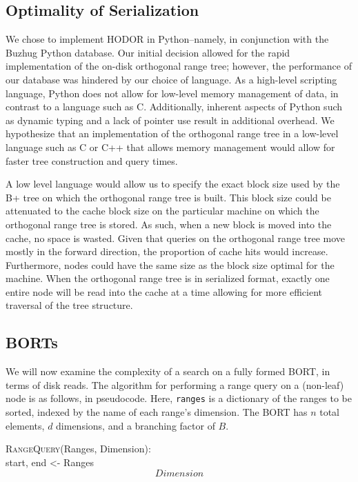 \documentclass[11pt, oneside]{article}
\newcommand{\ms}{\texttt}
\begin{document}
\subsection{Optimality of Serialization}

We chose to implement HODOR in Python--namely, in conjunction with the Buzhug Python database. Our initial decision allowed for the rapid implementation of the on-disk orthogonal range tree; however, the performance of our database was hindered by our choice of language. As a high-level scripting language, Python does not allow for low-level memory management of data, in contrast to a language such as C. Additionally, inherent aspects of Python such as dynamic typing and a lack of pointer use result in additional overhead. We hypothesize that an implementation of the orthogonal range tree in a low-level language such as C or C++ that allows memory management would allow for faster tree construction and query times. 

A low level language would allow us to specify the exact block size used by the B+ tree on which the orthogonal range tree is built. This block size could be attenuated to the cache block size on the particular machine on which the orthogonal range tree is stored. As such, when a new block is moved into the cache, no space is wasted. Given that queries on the orthogonal range tree move mostly in the forward direction, the proportion of cache hits would increase. Furthermore, nodes could have the same size as the block size optimal for the machine. When the orthogonal range tree is in serialized format, exactly one entire node will be read into the cache at a time allowing for more efficient traversal of the tree structure.

\subsection{BORTs}

We will now examine the complexity of a search on a fully formed BORT, in terms
of disk reads. The algorithm for performing a range query on a (non-leaf) node
is as follows, in pseudocode. Here, \ms{ranges} is a dictionary of the
ranges to be sorted, indexed by the name of each range's dimension. The BORT has
$n$ total elements, $d$ dimensions, and a branching factor of $B$.

\textsc{RangeQuery}(Ranges, Dimension): \\
    start, end <- Ranges\[Dimension\] \\
    
\end{document}
